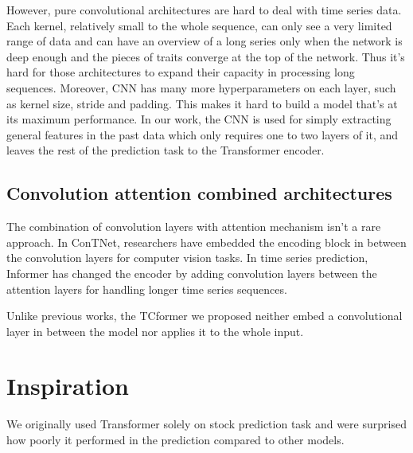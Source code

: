 \documentclass[stu,12pt,floatsintext]{apa7}
\begin{document}
However, pure convolutional architectures are hard to deal with time series data. Each kernel, relatively small to the whole sequence, can only see a very limited range of data and can have an overview of a long series only when the network is deep enough and the pieces of traits converge at the top of the network. Thus it's hard for those architectures to expand their capacity in processing long sequences. Moreover, CNN has many more hyperparameters on each layer, such as kernel size, stride and padding. This makes it hard to build a model that's at its maximum performance. In our work, the CNN is used for simply extracting general features in the past data which only requires one to two layers of it, and leaves the rest of the prediction task to the Transformer encoder. 

\subsection{Convolution attention combined architectures}

The combination of convolution layers with attention mechanism isn't a rare approach. In ConTNet, researchers have embedded the encoding block in between the convolution layers \cite{yan2021contnetuseconvolutiontransformer} for computer vision tasks. In time series prediction, Informer \cite{informer} has changed the encoder by adding convolution layers between the attention layers for handling longer time series sequences. 

Unlike previous works, the TCformer we proposed neither embed a convolutional layer in between the model nor applies it to the whole input.

\section{Inspiration}
We originally used Transformer solely on stock prediction task and were surprised how poorly it performed in the prediction compared to other models.
\end{document}
